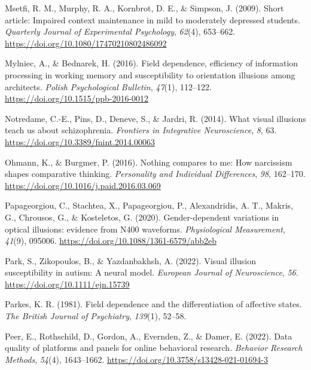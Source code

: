 \documentclass[
  man,floatsintext]{apa6}
\newlength{\cslhangindent}
\newlength{\cslentryspacingunit} %
\newenvironment{CSLReferences}[2] %
 {%
  \setlength{\parindent}{0pt}
  \ifodd #1
  \let\oldpar\par
  \def\par{\hangindent=\cslhangindent\oldpar}
  \fi
  \setlength{\parskip}{#2\cslentryspacingunit}
 }%
 {}
\begin{document}
\begin{CSLReferences}{1}{0}
\leavevmode{}%
Msetfi, R. M., Murphy, R. A., Kornbrot, D. E., \& Simpson, J. (2009). Short article: Impaired context maintenance in mild to moderately depressed students. \emph{Quarterly Journal of Experimental Psychology}, \emph{62}(4), 653--662. \url{https://doi.org/10.1080/17470210802486092}

\leavevmode{}%
Mylniec, A., \& Bednarek, H. (2016). Field dependence, efficiency of information processing in working memory and susceptibility to orientation illusions among architects. \emph{Polish Psychological Bulletin}, \emph{47}(1), 112--122. \url{https://doi.org/10.1515/ppb-2016-0012}

\leavevmode{}%
Notredame, C.-E., Pins, D., Deneve, S., \& Jardri, R. (2014). What visual illusions teach us about schizophrenia. \emph{Frontiers in Integrative Neuroscience}, \emph{8}, 63. \url{https://doi.org/10.3389/fnint.2014.00063}

\leavevmode{}%
Ohmann, K., \& Burgmer, P. (2016). Nothing compares to me: How narcissism shapes comparative thinking. \emph{Personality and Individual Differences}, \emph{98}, 162--170. \url{https://doi.org/10.1016/j.paid.2016.03.069}

\leavevmode{}%
Papageorgiou, C., Stachtea, X., Papageorgiou, P., Alexandridis, A. T., Makris, G., Chrousos, G., \& Kosteletos, G. (2020). Gender-dependent variations in optical illusions: evidence from N400 waveforms. \emph{Physiological Measurement}, \emph{41}(9), 095006. \url{https://doi.org/10.1088/1361-6579/abb2eb}

\leavevmode{}%
Park, S., Zikopoulos, B., \& Yazdanbakhsh, A. (2022). Visual illusion susceptibility in autism: A neural model. \emph{European Journal of Neuroscience}, \emph{56}. \url{https://doi.org/10.1111/ejn.15739}

\leavevmode{}%
Parkes, K. R. (1981). Field dependence and the differentiation of affective states. \emph{The British Journal of Psychiatry}, \emph{139}(1), 52--58.

\leavevmode{}%
Peer, E., Rothschild, D., Gordon, A., Evernden, Z., \& Damer, E. (2022). Data quality of platforms and panels for online behavioral research. \emph{Behavior Research Methods}, \emph{54}(4), 1643--1662. \url{https://doi.org/10.3758/s13428-021-01694-3}


\end{CSLReferences}
\end{document}

